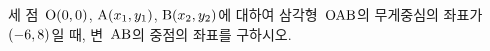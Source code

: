 세 점~$\mathrm{O}(0{,}\mkern3mu\mathopen{}0)$, $\mathrm{A}(x_1{,}\mkern3mu\mathopen{}y_1)$, $\mathrm{B}(x_2{,}\mkern3mu\mathopen{}y_2)$에 대하여 삼각형~$\mathrm{OAB}$의 무게중심의 좌표가 $(-6{,}\mkern3mu\mathopen{}8)$일 때, 변~$\mathrm{AB}$의 중점의 좌표를 구하시오.
